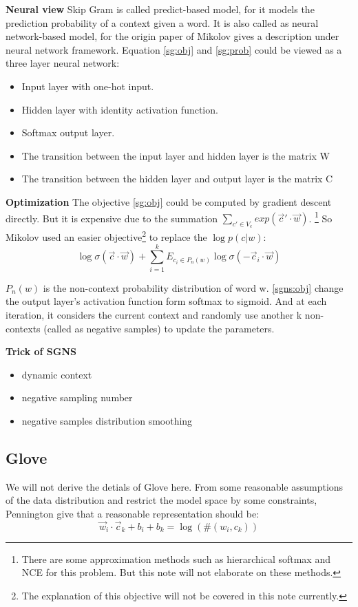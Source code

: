 \documentclass{article} %
\begin{document}
\textbf{Neural view}
Skip Gram is called predict-based model, for it models the prediction probability of a context given a word. It is also called as neural network-based model, for the origin paper of Mikolov gives a description under neural network framework. Equation \eqref{sg:obj} and \eqref{sg:prob} could be viewed as a three layer neural network:
\begin{itemize}
\item Input layer with one-hot input. 
\item Hidden layer with identity activation function.
\item Softmax output layer.
\item The transition between the input layer and hidden layer is the matrix W
\item The transition between the hidden layer and output layer is the matrix C
\end{itemize}
\textbf{Optimization}
The objective \eqref{sg:obj} could be computed by gradient descent directly. But it is expensive due to the summation $\sum\limits_{c' \in {V_c}}{exp(\vec{c}'\cdot\vec{w})}$. \footnote{There are some approximation methods such as hierarchical softmax and NCE for this problem. But this note will not elaborate on these methods.} So Mikolov used an easier objective\footnote{The explanation of this objective will not be covered in this note currently.} to replace the $\log{p(c|w)}$:
\begin{equation}\label{sgns:obj}
\log{\sigma({\vec{c}\cdot\vec{w}})} + \sum\limits_{i=1}^{k}{E_{c_i \in P_n{(w)}}}{\log{\sigma(-{\vec{c}_i}\cdot\vec{w})}}
\end{equation}

$P_n{(w)}$ is the non-context probability distribution of word w. \eqref{sgns:obj} change the output layer's activation function form softmax to sigmoid. And at each iteration, it considers the current context and randomly use another k non-contexts (called as negative samples) to update the parameters.

\textbf{Trick of SGNS} 
\begin{itemize}
\item dynamic context

\item negative sampling number

\item negative samples distribution smoothing
\end{itemize}
\subsection{Glove}
We will not derive the detials of Glove here. From some reasonable assumptions of the data distribution and restrict the model space by some constraints, Pennington give that a reasonable representation should be:
\begin{equation}
\vec{w}_i\cdot\vec{c}_k + b_i + b_k = \log{(\#(w_i,c_k))}
\end{equation}
\end{document}

